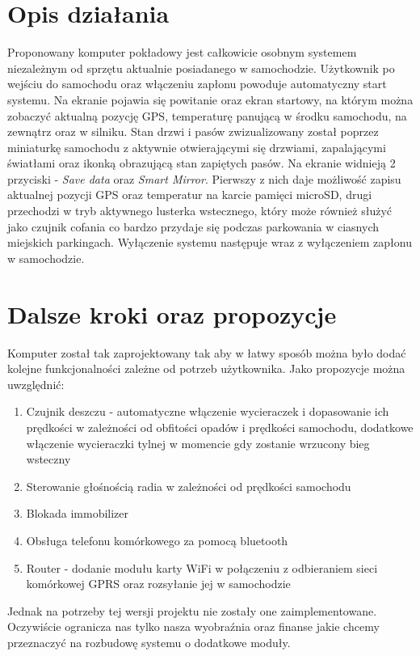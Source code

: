 \documentclass{xmgr}
\begin{document}
\section{Opis działania}
Proponowany komputer pokładowy jest całkowicie osobnym systemem niezależnym od sprzętu aktualnie posiadanego w samochodzie. Użytkownik po wejściu do samochodu oraz włączeniu zapłonu powoduje automatyczny start systemu. Na ekranie pojawia się powitanie oraz ekran startowy, na którym można zobaczyć aktualną pozycję GPS, temperaturę panującą w środku samochodu, na zewnątrz oraz w silniku. Stan drzwi i pasów zwizualizowany został poprzez miniaturkę samochodu z aktywnie otwierającymi się drzwiami, zapalającymi światłami oraz ikonką obrazującą stan zapiętych pasów. Na ekranie widnieją 2 przyciski - \emph{Save data} oraz \emph{Smart Mirror}. Pierwszy z nich daje możliwość zapisu aktualnej pozycji GPS oraz temperatur na karcie pamięci microSD, drugi przechodzi w tryb aktywnego lusterka wstecznego, który może również służyć jako czujnik cofania co bardzo przydaje się podczas parkowania w ciasnych miejskich parkingach. Wyłączenie systemu następuje wraz z wyłączeniem zapłonu w samochodzie.

\section{Dalsze kroki oraz propozycje}
Komputer został tak zaprojektowany tak aby w łatwy sposób można było dodać kolejne funkcjonalności zależne od potrzeb użytkownika. Jako propozycje można uwzględnić:
\begin{enumerate}
	\item Czujnik deszczu - automatyczne włączenie wycieraczek i dopasowanie ich prędkości w zależności od obfitości opadów i prędkości samochodu, dodatkowe włączenie wycieraczki tylnej w momencie gdy zostanie wrzucony bieg wsteczny
	\item Sterowanie głośnością radia w zależności od prędkości samochodu
	\item Blokada immobilizer
	\item Obsługa telefonu komórkowego za pomocą bluetooth
	\item Router - dodanie modułu karty WiFi w połączeniu z odbieraniem sieci komórkowej GPRS oraz rozsyłanie jej w samochodzie
\end{enumerate}
Jednak na potrzeby tej wersji projektu nie zostały one zaimplementowane. Oczywiście ogranicza nas tylko nasza wyobraźnia oraz finanse jakie chcemy przeznaczyć na rozbudowę systemu o dodatkowe moduły. 
\end{document}
